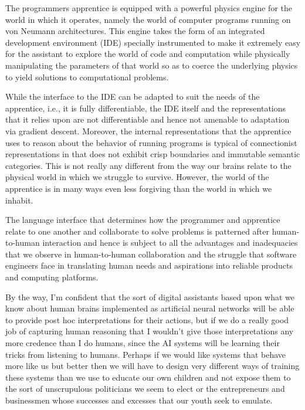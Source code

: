The programmers apprentice is equipped with a powerful physics engine for the world in which it operates, namely the world of computer programs running on von Neumann architectures. This engine takes the form of an integrated development environment (IDE) specially instrumented to make it extremely easy for the assistant to explore the world of code and computation while physically manipulating the parameters of that world so as to coerce the underlying physics to yield solutions to computational problems. 

While the interface to the IDE can be adapted to suit the needs of the apprentice, i.e., it is fully differentiable, the IDE itself and the representations that it relies upon are not differentiable and hence not amenable to adaptation via gradient descent. Moreover, the internal representations that the apprentice uses to reason about the behavior of running programs is typical of connectionist representations in that does not exhibit crisp boundaries and immutable semantic categories. This is not really any different from the way our brains relate to the physical world in which we struggle to survive. However, the world of the apprentice is in many ways even less forgiving than the world in which we inhabit.

The language interface that determines how the programmer and apprentice relate to one another and collaborate to solve problems is patterned after human-to-human interaction and hence is subject to all the advantages and inadequacies that we observe in human-to-human collaboration and the struggle that software engineers face in translating human needs and aspirations into reliable products and computing platforms.

By the way, I'm confident that the sort of digital assistants based upon what we know about human brains implemented as artificial neural networks will be able to provide post hoc interpretations for their actions, but if we do a really good job of capturing human reasoning that I wouldn't give those interpretations any more credence than I do humans, since the AI systems will be learning their tricks from listening to humans. Perhaps if we would like systems that behave more like us but better then we will have to design very different ways of training these systems than we use to educate our own children and not expose them to the sort of unscrupulous politicians we seem to elect or the entrepreneurs and businessmen whose successes and excesses that our youth seek to emulate.

